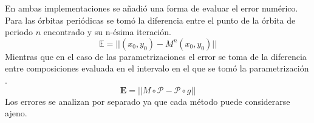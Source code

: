 En ambas implementaciones se añadi\'o una forma de evaluar el error num\'erico. Para las \'orbitas peri\'odicas se tom\'o la diferencia entre el punto de la \'orbita de periodo $n$ encontrado y su n-\'esima iteraci\'on.
\begin{equation}
	\mathbb{E} = ||(x_{0},y_{0})-M^{n}(x_{0},y_{0})||
	\label{errororbitasperiodicas}
\end{equation}
Mientras que en el caso de las parametrizaciones el error se toma de la diferencia entre composiciones evaluada en el intervalo en el que se tom\'o la parametrizaci\'on  \cite{Mireles}. 
\begin{equation}
	\mathbf{E} = || M\circ \mathcal{P}- \mathcal{P}\circ g||
\end{equation}
Los errores se analizan por separado ya que cada m\'etodo puede considerarse ajeno. 






